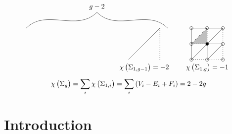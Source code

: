 {$$\begin{tikzpicture}[scale=0.8]
\draw [dotted, thick] (4, 1) to (4, -1);
\draw (2, -1) to (4, 1);
\draw (3, -1.5) node{$ \chi\br{\Sigma_{1, g - 1}} = -2 $};
\fill [lightgray] (6, 0) to (7, 1) to (7, 0) to cycle;
\draw [dotted, thick] (6, 0) to (7, 1) to (7, 0) to cycle;
\draw (6, 1) circle (0.1);
\draw (7, 1) circle (0.1);
\draw (8, 1) circle (0.1);
\draw (6, 0) circle (0.1);
\fill (7, 0) circle (0.1);
\draw (8, 0) circle (0.1);
\draw (6, -1) circle (0.1);
\draw (7, -1) circle (0.1);
\draw (8, -1) circle (0.1);
\draw (6, 1) to (8, 1);
\draw (7, 0) to (8, 0);
\draw [dotted, thick] (6, -1) to (8, -1);
\draw (6, 1) to (6, -1);
\draw (7, 0) to (7, -1);
\draw [dotted, thick] (8, 1) to (8, -1);
\draw (6, -1) to (8, 1);
\draw (7, -1) to (8, 0);
\draw (7, -1.5) node{$ \chi\br{\Sigma_{1, g}} = -1 $};
\draw (0, 2) node[above]{$ g - 2 $};
\draw (-4.5, 1) to [out=45, in=-135] (0, 2);
\draw (4.5, 1) to [out=135, in=-45] (0, 2);
\end{tikzpicture}
$$
$$ \chi\br{\Sigma_g} = \sum_i \chi\br{\Sigma_{1, i}} = \sum_i \br{V_i - E_i + F_i} = 2 - 2g $$
}
\def\syllabus{Parametrisations of curves in three-dimensional space. Curvature. Torsion. Frenet–Serret formulae. Winding number. Charts of surfaces. Tangent vectors. Tangent planes. Smooth maps between surfaces. Normal vectors. The first fundamental form. The second fundamental form. Christoffel symbols. Normal curvature. Gaussian curvature. Mean curvature. Gauss's Theorema Egregium. Area of surfaces. Length-minimising curves. Geodesic curvature. The Gauss–Bonnet theorem and applications.}
\def\thm{subsection}







\section{Introduction}


